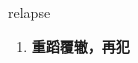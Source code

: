 
\begin{frame}
{\huge relapse}
\begin{center}
\begin{enumerate}\Large
  \item \textbf{重蹈覆辙，再犯}
\end{enumerate}
\end{center}
\end{frame}
